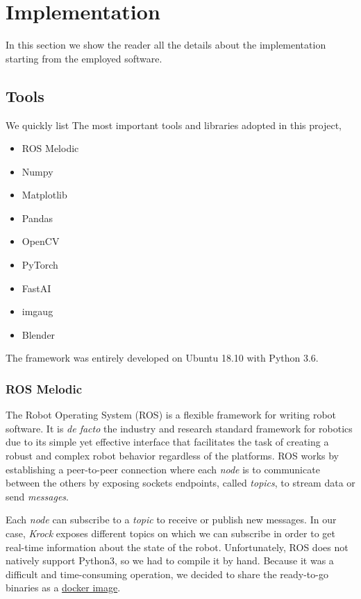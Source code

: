 \documentclass[../document.tex]{subfiles}
\begin{document}
\section{Implementation}
In this section we show the reader all the details about the implementation starting from the employed software.
\subsection{Tools}
We quickly list The most important tools and libraries adopted in this project,
\begin{itemize}
    \item ROS Melodic
    \item Numpy
    \item Matplotlib
    \item Pandas
    \item OpenCV
    \item PyTorch
    \item FastAI
    \item imgaug
    \item Blender
\end{itemize}
The framework was entirely developed on Ubuntu 18.10 with Python 3.6.

\subsubsection{ROS Melodic}
The Robot Operating System (ROS) \cite{ROS} is a flexible framework for writing robot software. It is \emph{de facto} the industry and research standard framework for robotics due to its simple yet effective interface that facilitates the task of creating a robust and complex robot behavior regardless of the platforms. ROS works by establishing a peer-to-peer connection where each \emph{node} is to communicate between the others by exposing sockets endpoints, called \emph{topics}, to stream data or send \emph{messages}. 

Each \emph{node} can subscribe to a \emph{topic} to receive or publish new messages. In our case, \emph{Krock} exposes different topics on which we can subscribe in order to get real-time information about the state of the robot.
Unfortunately, ROS does not natively support Python3, so we had to compile it by hand. Because it was a difficult and time-consuming operation, we decided to share the ready-to-go binaries as a \href{https://hub.docker.com/r/zuppif/ros-melodic-python3/}{docker image}. 
\end{document}
